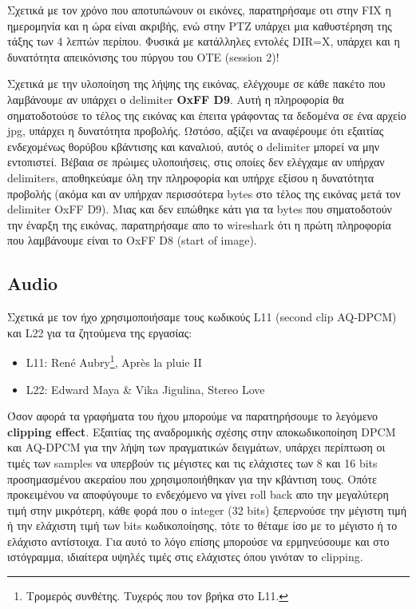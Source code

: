 \documentclass[hidelinks, 12pt, a4paper]{article}
\begin{document}
Σχετικά με τον χρόνο που αποτυπώνουν οι εικόνες, παρατηρήσαμε οτι στην FIX η ημερομηνία και η ώρα είναι ακριβής, ενώ στην PTZ υπάρχει μια καθυστέρηση της τάξης των 4 λεπτών περίπου. Φυσικά με κατάλληλες εντολές DIR=X, υπάρχει και η δυνατότητα απεικόνισης του πύργου του ΟΤΕ (session 2)!

Σχετικά με την υλοποίηση  της λήψης της εικόνας, ελέγχουμε σε κάθε πακέτο που λαμβάνουμε αν υπάρχει ο delimiter \textbf{OxFF D9}. Αυτή η πληροφορία θα σηματοδοτούσε το τέλος της εικόνας και έπειτα γράφοντας τα δεδομένα σε ένα αρχείο jpg, υπάρχει η δυνατότητα προβολής. Ωστόσο, αξίζει να αναφέρουμε ότι εξαιτίας ενδεχομένως θορύβου κβάντισης και καναλιού, αυτός ο delimiter μπορεί να μην εντοπιστεί. Βέβαια σε πρώιμες υλοποιήσεις, στις οποίες δεν ελέγχαμε αν υπήρχαν delimiters, αποθηκεύαμε όλη την πληροφορία και υπήρχε εξίσου η δυνατότητα προβολής (ακόμα και αν υπήρχαν περισσότερα bytes στο τέλος της εικόνας μετά τον delimiter OxFF D9). Μιας και δεν ειπώθηκε κάτι για τα bytes που σηματοδοτούν την έναρξη της εικόνας, παρατηρήσαμε απο το wireshark ότι η πρώτη πληροφορία που λαμβάνουμε είναι το OxFF D8 (start of image).

\subsection{Audio}

Σχετικά με τον ήχο χρησιμοποιήσαμε τους κωδικούς L11 (second clip AQ-DPCM) και L22  για τα ζητούμενα της εργασίας: 
\begin{itemize}
    \item L11: René Aubry\footnote{Τρομερός συνθέτης. Τυχερός που τον βρήκα στο L11.}, Après la pluie II
    \item L22: Edward Maya \& Vika Jigulina, Stereo Love
\end{itemize}

Όσον αφορά τα γραφήματα του ήχου μπορούμε να παρατηρήσουμε το λεγόμενο \textbf{clipping effect}. Εξαιτίας της αναδρομικής σχέσης στην αποκωδικοποίηση DPCM και AQ-DPCM για την λήψη των πραγματικών δειγμάτων, υπάρχει περίπτωση οι τιμές των samples να υπερβούν τις μέγιστες και τις ελάχιστες των 8 και 16 bits προσημασμένου ακεραίου που χρησιμοποιήθηκαν για την κβάντιση τους. Οπότε προκειμένου να αποφύγουμε το ενδεχόμενο να γίνει roll back απο την μεγαλύτερη τιμή στην μικρότερη, κάθε φορά που ο integer (32 bits) ξεπερνούσε την μέγιστη τιμή ή την ελάχιστη τιμή των bits κωδικοποίησης, τότε το θέταμε ίσο με το μέγιστο ή το ελάχιστο αντίστοιχα. Για αυτό το λόγο επίσης μπορούσε να ερμηνεύσουμε και στο ιστόγραμμα, ιδιαίτερα υψηλές τιμές στις ελάχιστες όπου γινόταν το clipping.
\end{document}
